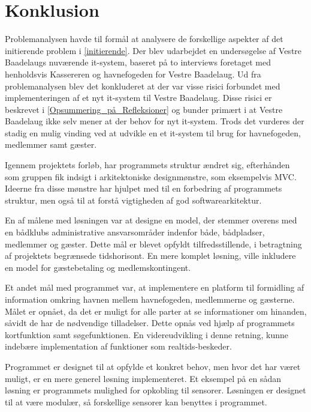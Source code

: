 \chapter{Konklusion}
\label{cha:konklusion}
Problemanalysen havde til formål at analysere de forskellige aspekter af det initierende problem i \cref{initierende}. Der blev udarbejdet en undersøgelse af Vestre Baadelaugs nuværende it-system, baseret på to interviews foretaget med henholdsvis Kassereren og havnefogeden for Vestre Baadelaug. Ud fra problemanalysen blev det konkluderet at der var visse risici forbundet med implementeringen af et nyt it-system til Vestre Baadelaug. Disse risici er beskrevet i \cref{Opsummering_på_Refleksioner} og bunder primært i at Vestre Baadelaug ikke selv mener at der behov for nyt it-system. Trods det vurderes der stadig en mulig vinding ved at udvikle en et it-system til brug for havnefogeden, medlemmer samt gæster.  

Igennem projektets forløb, har programmets struktur ændret sig, efterhånden som gruppen fik indsigt i arkitektoniske designmønstre, som eksempelvis MVC. Ideerne fra disse mønstre har hjulpet med til en forbedring af programmets struktur, men også til at forstå vigtigheden af god softwarearkitektur.

En af målene med løsningen var at designe en model, der stemmer overens med en bådklubs administrative ansvarsområder indenfor både, bådpladser, medlemmer og gæster. Dette mål er blevet opfyldt tilfredsstillende, i betragtning af projektets begrænsede tidshorisont. En mere komplet løsning, ville inkludere en model for gæstebetaling og medlemskontingent.

Et andet mål med programmet var, at implementere en platform til formidling af information omkring havnen mellem havnefogeden, medlemmerne og gæsterne. Målet er opnået, da det er muligt for alle parter at se informationer om hinanden, såvidt de har de nødvendige tilladelser. Dette opnås ved hjælp af programmets kortfunktion samt søgefunktionen. En videreudvikling i denne retning, kunne indebære implementation af funktioner som realtids-beskeder.

Programmet er designet til at opfylde et konkret behov, men hvor det har været muligt, er en mere generel løsning implementeret. Et eksempel på en sådan løsning er programmets mulighed for opkobling til sensorer. Løsningen er designet til at være modulær, så forskellige sensorer kan benyttes i programmet.


